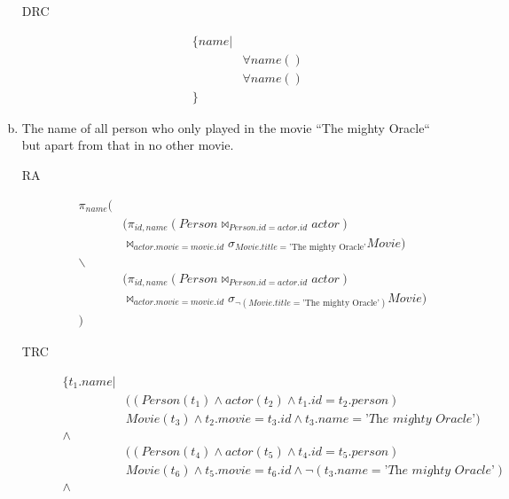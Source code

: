 \documentclass[11pt,a4paper,DIV=9]{scrartcl}
\begin{document}
\begin{enumerate}[a)]
\begin{description}
        \item [DRC]
        \begin{align*}
        \{ name | & \\
                  & \forall name () 
                  & \\
                  & \forall name () \\
        \}
        \end{align*}
      \end{description}
    \item The name of all person who only played in the movie ``The mighty Oracle`` but apart from that in no other movie.\hfill\\
        \begin{description}
          \item [RA]  \begin{align*}
                        \pi_{name} (&\\
                            &(\pi_{id,name}(Person\Join_{Person.id = actor.id}actor)\\
                            &\Join_{actor.movie = movie.id}\sigma_{Movie.title=\textrm{'The mighty Oracle'}}Movie)\\
                         \backslash &\\
                            &(\pi_{id,name}(Person\Join_{Person.id = actor.id}actor)\\
                            &\Join_{actor.movie = movie.id}\sigma_{\neg(Movie.title=\textrm{'The mighty Oracle'})}Movie)\\
                        )
                      \end{align*}
          \item [TRC] \begin{align*}
                      \{ t_1.name | & \\
                      & ((Person(t_1) \wedge actor(t_2) \wedge t_1.id=t_2.person) \\
                      & Movie(t_3) \wedge t_2.movie = t_3.id \wedge t_3.name=\textit{'The mighty Oracle'})\\
                      \wedge\\
                      & ((Person(t_4) \wedge actor(t_5) \wedge t_4.id=t_5.person) \\
                      & Movie(t_6) \wedge t_5.movie = t_6.id \wedge \neg(t_3.name=\textit{'The mighty Oracle'})\\
                      \wedge \\

\end{align*}
\end{description}
\end{enumerate}
\end{document}
